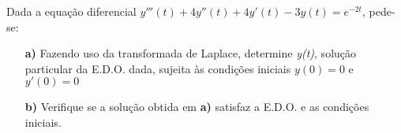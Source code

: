 \linespread{1.5}
Dada a equação diferencial $y'''(t) + 4y''(t) + 4y'(t) - 3y(t) = e^{-2t}$, pede-se:
\begin{itemize}
    \item[\textbf{a)}] Fazendo uso da transformada de Laplace, determine \textit{y(t)}, solução particular da E.D.O. dada, sujeita às condições iniciais $y(0) = 0$ e $y'(0) = 0$
    \item[\textbf{b)}] Verifique se a solução obtida em \textbf{a)} satisfaz a E.D.O. e as condições iniciais.
\end{itemize}